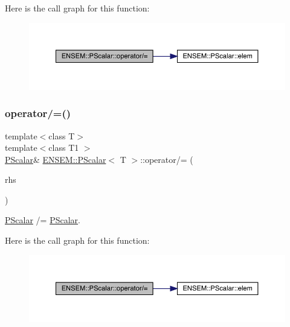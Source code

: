 Here is the call graph for this function\+:
\nopagebreak
\begin{figure}[H]
\begin{center}
\leavevmode
\includegraphics[width=350pt]{d3/d27/classENSEM_1_1PScalar_a72bf5e7494fc6c8831d0003f8fb62a16_cgraph}
\end{center}
\end{figure}
\mbox{\label{classENSEM_1_1PScalar_a72bf5e7494fc6c8831d0003f8fb62a16}} 
\subsubsection{\texorpdfstring{operator/=()}{operator/=()}\hspace{0.1cm}{\footnotesize\ttfamily [3/3]}}
{\footnotesize\ttfamily template$<$class T$>$ \\
template$<$class T1 $>$ \\
\mbox{\hyperlink{classENSEM_1_1PScalar}{P\+Scalar}}\& \mbox{\hyperlink{classENSEM_1_1PScalar}{E\+N\+S\+E\+M\+::\+P\+Scalar}}$<$ T $>$\+::operator/= (\begin{DoxyParamCaption}\item[{const \mbox{\hyperlink{classENSEM_1_1PScalar}{P\+Scalar}}$<$ T1 $>$ \&}]{rhs }\end{DoxyParamCaption})\hspace{0.3cm}{\ttfamily [inline]}}



\mbox{\hyperlink{classENSEM_1_1PScalar}{P\+Scalar}} /= \mbox{\hyperlink{classENSEM_1_1PScalar}{P\+Scalar}}. 

Here is the call graph for this function\+:
\nopagebreak
\begin{figure}[H]
\begin{center}
\leavevmode
\includegraphics[width=350pt]{d3/d27/classENSEM_1_1PScalar_a72bf5e7494fc6c8831d0003f8fb62a16_cgraph}
\end{center}
\end{figure}
\mbox{\label{classENSEM_1_1PScalar_ade643675ab6ef041676e1098ac740b29}} 
